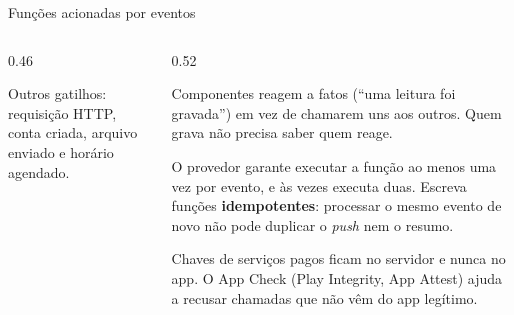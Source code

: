 \begin{frame}{Funções acionadas por eventos}
  \begin{columns}[c]
    \begin{column}{0.46\textwidth}
      \centering
      \begin{dica}
        Outros gatilhos: requisição HTTP, conta criada, arquivo enviado e horário agendado.
      \end{dica}
    \end{column}
    \begin{column}{0.52\textwidth}
      \begin{definicao}
        Componentes reagem a fatos (``uma leitura foi gravada'') em vez de chamarem uns aos outros. Quem grava não precisa saber quem reage.
      \end{definicao}
      \begin{atencao}
        O provedor garante executar a função ao menos uma vez por evento, e às vezes executa duas. Escreva funções \textbf{idempotentes}: processar o mesmo evento de novo não pode duplicar o \emph{push} nem o resumo.
      \end{atencao}
      \begin{pordentro}
        Chaves de serviços pagos ficam no servidor e nunca no app. O App Check (Play Integrity, App Attest) ajuda a recusar chamadas que não vêm do app legítimo.
      \end{pordentro}
    \end{column}
  \end{columns}
\end{frame}
